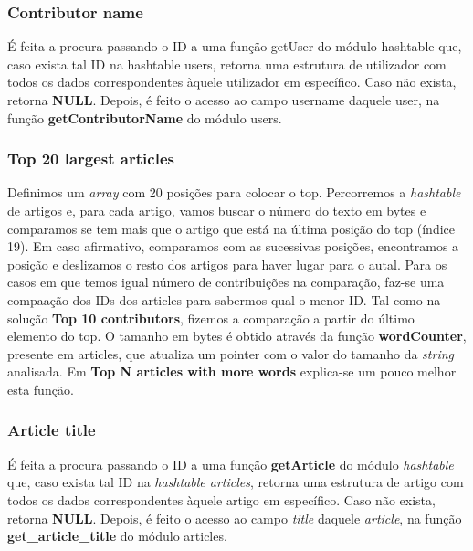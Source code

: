 \documentclass[a4paper]{article}
\begin{document}
\subsubsection{Contributor name}
É feita a procura passando o ID a uma função getUser do módulo hashtable que, caso exista tal ID na hashtable users, retorna uma estrutura de utilizador com todos os dados correspondentes àquele utilizador em específico. Caso não exista, retorna \textbf{NULL}. Depois, é feito o acesso ao campo username daquele user, na função \textbf{getContributorName} do módulo users.

\subsubsection{Top 20 largest articles}
Definimos um \textit{array} com 20 posições para colocar o top. Percorremos a \textit{hashtable} de artigos e, para cada artigo, vamos buscar o número do texto em bytes e comparamos se tem mais que o artigo que está na última posição do top (índice 19). Em caso afirmativo, comparamos com as sucessivas posições, encontramos a posição e deslizamos o resto dos artigos para haver lugar para o autal. Para os casos em que temos igual número de contribuições na comparação, faz-se uma compaação dos IDs dos articles para sabermos qual o menor ID.
Tal como na solução \textbf{Top 10 contributors}, fizemos a comparação a partir do último elemento do top.
O tamanho em bytes é obtido através da função \textbf{wordCounter}, presente em articles, que atualiza um pointer com o valor do tamanho da \textit{string} analisada. Em \textbf{Top N articles with more words} explica-se um pouco melhor esta função.

\subsubsection{Article title}
É feita a procura passando o ID a uma função \textbf{getArticle} do módulo \textit{hashtable} que, caso exista tal ID na \textit{hashtable articles}, retorna uma estrutura de artigo com todos os dados correspondentes àquele artigo em específico. Caso não exista, retorna \textbf{NULL}. Depois, é feito o acesso ao campo \textit{title} daquele \textit{article}, na função \textbf{get\_article\_title} do módulo articles.
\end{document}
